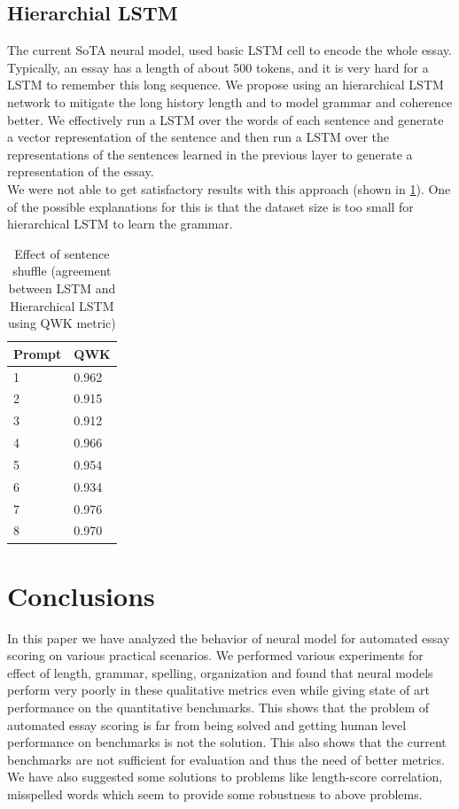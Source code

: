 \documentclass[11pt,a4paper]{article}
\newcommand{\acomment}[1]{{\bf{\color{blue}{{[Aman: #1]}}}}}
\begin{document}
  


\subsection{Hierarchial LSTM}

The current SoTA neural model, used basic LSTM cell to encode the whole essay. Typically, an essay has a length of about 500 tokens, and it is very hard for a LSTM to remember this long sequence. We propose using an hierarchical LSTM network to mitigate the long history length and to model grammar and coherence better. We effectively run a LSTM over the words of each sentence and generate a vector representation of the sentence and then run a LSTM over the representations of the sentences learned in the previous layer to generate a representation of the essay.\\ 
We were not able to get satisfactory results with this approach (shown in \cref{hlstm}). One of the possible explanations for this is that the dataset size is too small for hierarchical LSTM to learn the grammar.


\begin{table}[]
  \centering
  \begin{tabular}{|l|l|}
  \hline
  \textbf{Prompt} & \textbf{QWK} \\ \hline
  1 & 0.962 \\ \hline
  2 & 0.915 \\ \hline
  3 & 0.912 \\ \hline
  4 & 0.966 \\ \hline
  5 & 0.954 \\ \hline
  6 & 0.934 \\ \hline
  7 & 0.976 \\ \hline
  8 & 0.970 \\ \hline
  \end{tabular}
  \caption{Effect of sentence shuffle (agreement between LSTM and Hierarchical LSTM using QWK metric)}
  \label{hlstm}
\end{table}


\section{Conclusions}
In this paper we have analyzed the behavior of neural model for automated essay scoring on various practical scenarios. We performed various experiments for effect of length, grammar, spelling, organization and found that neural models perform very poorly in these qualitative metrics even while giving state of art performance on the quantitative benchmarks. This shows that the problem of automated essay scoring is far from being solved and getting human level performance on benchmarks is not the solution. This also shows that the current benchmarks are not sufficient for evaluation and thus the need of better metrics. We have also suggested some solutions to problems like length-score correlation, misspelled words which seem to provide some robustness to above problems.




\end{document}
